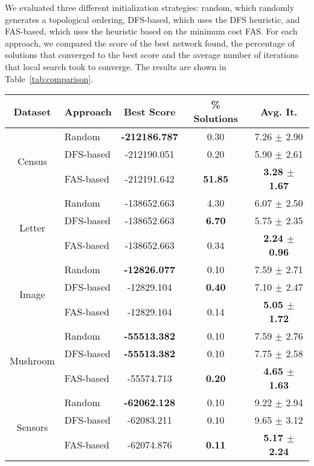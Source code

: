 We evaluated three different initialization strategies: random, which randomly generates a topological ordering, DFS-based, which uses the DFS heuristic, and FAS-based, which uses the heuristic based on the minimum cost FAS. For each approach, we compared the score of the best network found, the percentage of solutions that converged to the best score and the average number of iterations that local search took to converge. The results are shown in Table~\ref{tab:comparison}.
	\begin{table}[ h ]
		\centering
		\begin{tabular}{|c|l|c|c|c|}
			\hline
			Dataset & Approach & Best Score & \% Solutions & Avg. It. \\ \hline
			\multirow{3}{*}{Census} & Random & \textbf{-212186.787} & 0.30 & 7.26 $\pm$ 2.90 \\ \cline{2-5} 
					& DFS-based & -212190.051 & 0.20 & 5.90 $\pm$ 2.61 \\ \cline{2-5}
					& FAS-based & -212191.642 & \textbf{51.85} & \textbf{3.28 $\pm$ 1.67} \\ \hline
			\multirow{3}{*}{Letter} & Random & -138652.663 & 4.30 & 6.07 $\pm$ 2.50 \\ \cline{2-5} 
					& DFS-based & -138652.663 & \textbf{6.70} & 5.75 $\pm$ 2.35 \\ \cline{2-5}
					& FAS-based & -138652.663 & 0.34 & \textbf{2.24 $\pm$ 0.96} \\ \hline
			\multirow{3}{*}{Image} & Random & \textbf{-12826.077} & 0.10 & 7.59 $\pm$ 2.71 \\ \cline{2-5} 
					& DFS-based & -12829.104 & \textbf{0.40} & 7.10 $\pm$ 2.47 \\ \cline{2-5}
					& FAS-based & -12829.104 & 0.14 & \textbf{5.05 $\pm$ 1.72} \\ \hline
			\multirow{3}{*}{Mushroom} & Random & \textbf{-55513.382} & 0.10 & 7.59 $\pm$ 2.76 \\ \cline{2-5} 
					& DFS-based & \textbf{-55513.382} & 0.10 & 7.75 $\pm$ 2.58 \\ \cline{2-5}
					& FAS-based & -55574.713 & \textbf{0.20} & \textbf{4.65 $\pm$ 1.63} \\ \hline
			\multirow{3}{*}{Sensors} & Random & \textbf{-62062.128} & 0.10 & 9.22 $\pm$ 2.94 \\ \cline{2-5} 
					& DFS-based & -62083.211 & 0.10 & 9.65 $\pm$ 3.12 \\ \cline{2-5}
					& FAS-based & -62074.876 & \textbf{0.11} & \textbf{5.17 $\pm$ 2.24} \\ \hline

\end{tabular}
\end{table}
